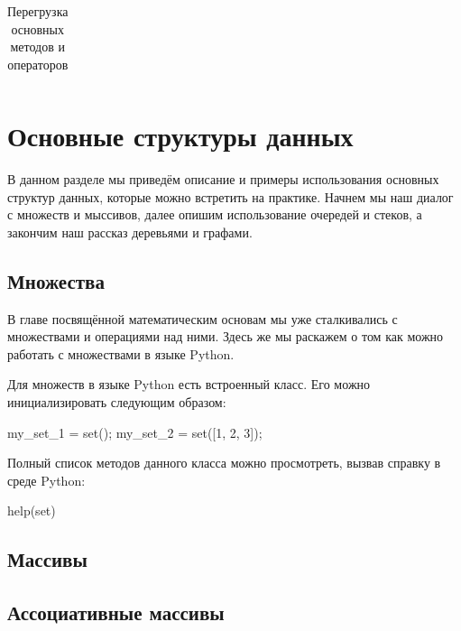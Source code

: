 \begin{table}[h!]
\begin{longtable}{|p{7cm}|p{8cm}|}



\end{longtable}
\caption{Перегрузка основных методов и операторов}
\label{tab:operators}
\end{table}

\chapter{Основные структуры данных}

В данном разделе мы приведём описание и примеры использования основных
структур данных, которые можно встретить на практике. Начнем мы наш 
диалог с множеств и мыссивов, далее опишим использование очередей и
стеков, а закончим наш рассказ деревьями и графами.

\section{Множества}

В главе посвящённой математическим основам мы уже сталкивались с
множествами и операциями над ними. Здесь же мы раскажем о том как 
можно работать с множествами в языке Python.

Для множеств в языке Python есть встроенный класс. Его можно инициализировать
следующим образом:

\begin{python}
my_set_1 = set();
my_set_2 = set([1, 2, 3]);
\end{python}

Полный список методов данного класса можно просмотреть, вызвав 
справку в среде Python:

\begin{python}
help(set)
\end{python}

\section{Массивы}

\section{Ассоциативные массивы}

